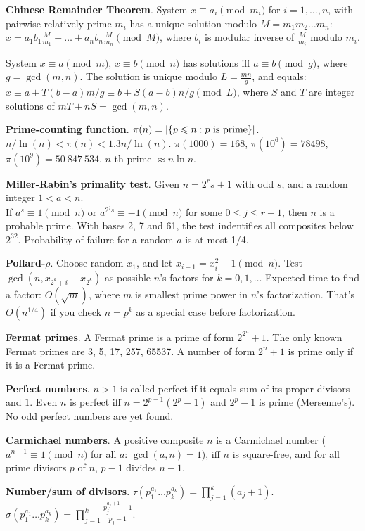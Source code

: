 \documentclass[a4paper, 12pt]{article}
\let\le=\leqslant
\newcommand{\Topic}[1]{\textbf{#1}}
\begin{document}
\Topic{Chinese Remainder Theorem}.
System $x \equiv a_i \pmod{m_i}$ for $i=1,\dots,n$, with
pairwise relatively-prime $m_i$ has a unique solution modulo $M = m_1 m_2 \dots m_n$:
$x = a_1 b_1 \frac{M}{m_1} + \dots + a_n b_n \frac{M}{m_n} \pmod{M}$,
where $b_i$ is modular inverse of $\frac{M}{m_i}$ modulo $m_i$.

System $x \equiv a \pmod{m}$, $x \equiv b \pmod{n}$ has solutions
iff $a \equiv b \pmod{g}$, where $g=\gcd(m,n)$.
The solution is unique modulo $L=\frac{mn}{g}$, and equals:
$x \equiv a + T(b-a) m/g \equiv b + S(a-b) n/g \pmod{L}$,
where $S$ and $T$ are integer solutions of $mT + nS = \gcd(m,n)$.

\Topic{Prime-counting function}. $\pi(n) = |\{p \le n : p \hbox{ is prime}\}|$.
$n/\ln(n) < \pi(n) < 1.3 n/\ln(n)$. 
$\pi(1000) = 168$, $\pi(10^6) = 78498$, $\pi(10^9) = 50\ 847\ 534$.
\quad $n$-th prime $\approx n \ln n$.

\Topic{Miller-Rabin's primality test}.
Given $n = 2^r s + 1$ with odd $s$, and a random integer $1 < a < n$. \\
If $a^s \equiv 1 {\pmod n}$ or $a^{2^j s} \equiv -1 {\pmod n}$ for some
$0 \le j \le r-1$, then $n$ is a probable prime.
With bases 2, 7 and 61, the test indentifies all composites below $2^{32}$.
Probability of failure for a random $a$ is at most 1/4.

\Topic{Pollard-$\rho$}.
Choose random $x_1$, and let $x_{i+1} = x_i^2 - 1 \pmod{n}$.
Test $\gcd(n, x_{2^k+i} - x_{2^k})$ as possible $n$'s factors for $k=0,1,\ldots$
Expected time to find a factor: $O(\sqrt{m})$, where $m$ is smallest
prime power in $n$'s factorization.
That's $O(n^{1/4})$ if you check $n = p^k$ as a special case before factorization.

\Topic{Fermat primes}.  A Fermat prime is a prime of form $2^{2^n}+1$.
The only known Fermat primes are 3, 5, 17, 257, 65537.
A number of form $2^n+1$ is prime only if it is a Fermat prime.


\Topic{Perfect numbers}.  $n>1$ is called perfect if it equals
sum of its proper divisors and $1$.  Even $n$ is perfect iff $n = 2^{p-1} (2^p - 1)$
and $2^p - 1$ is prime (Mersenne's). No odd perfect numbers are yet found.

\Topic{Carmichael numbers}.
A positive composite $n$ is a Carmichael number
($a^{n-1} \equiv 1 \pmod{n}$ for all $a$: $\gcd(a,n)=1$),
iff $n$ is square-free, and for all prime divisors $p$ of $n$, $p-1$ divides $n-1$.

\Topic{Number/sum of divisors}.
$\tau(p_1^{a_1} \dots p_k^{a_k}) = \prod_{j=1}^k (a_j+1)$. \quad
$\sigma(p_1^{a_1} \dots p_k^{a_k}) = \prod_{j=1}^k \frac{p_j^{a_j+1}-1}{p_j-1}$.
\end{document}
